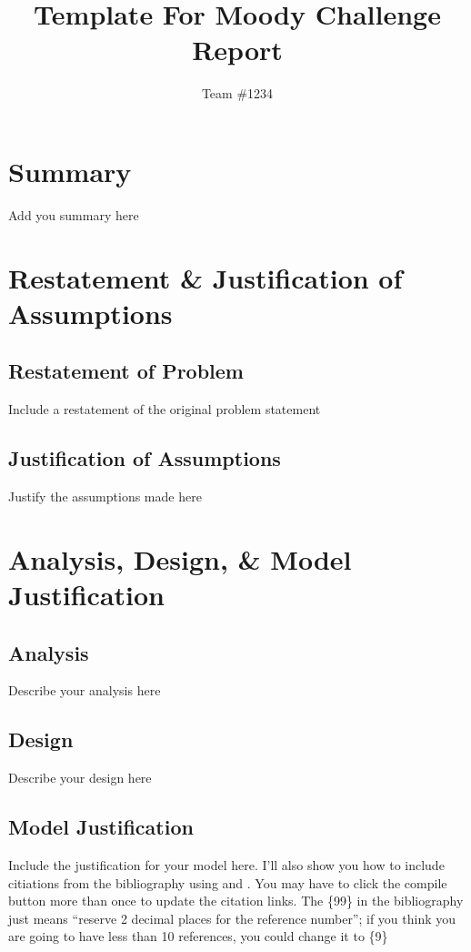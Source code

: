 \documentclass[12pt]{report}
\title{Template For Moody Challenge Report}
\author{Team \#1234}
\begin{document}
\maketitle
\tableofcontents

\chapter{Summary}
Add you summary here

\chapter{Restatement \& Justification of Assumptions}

\section{Restatement of Problem}
Include a restatement of the original problem statement

\section{Justification of Assumptions}
Justify the assumptions made here

\chapter{Analysis, Design, \& Model Justification}

\section{Analysis}
Describe your analysis here

\section{Design}
Describe your design here

\section{Model Justification}
Include the justification for your model here. I'll also show you how to include citiations from the bibliography using \cite{lamport94} and \cite{donnellan14}. You may have to click the compile button more than once to update the citation links. The \{99\} in the bibliography just means ``reserve 2 decimal places for the reference number''; if you think you are going to have less than 10 references, you could change it to \{9\}
\end{document}
